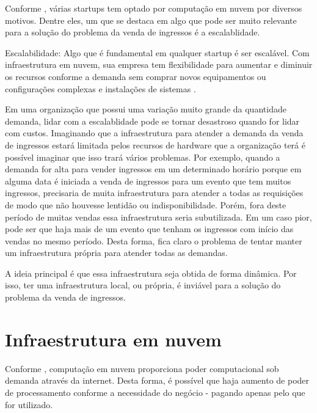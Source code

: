 Conforme \cite{beneficios-da-computacao-em-nuvem-para-sua-startup}, várias startups
tem optado por computação em nuvem por diversos motivos. Dentre eles, um que se destaca
em algo que pode ser muito relevante para a solução do problema da venda de ingressos é
a escalablidade.

\begin{citacao}
Escalabilidade: Algo que é fundamental em qualquer startup é ser escalável.
Com infraestrutura em nuvem, sua empresa tem flexibilidade para aumentar e
diminuir os recursos conforme a demanda sem comprar novos equipamentos ou
configurações complexas e instalações de
sistemas \cite{beneficios-da-computacao-em-nuvem-para-sua-startup}.

\end{citacao}

Em uma organização que possui uma variação muito grande da quantidade demanda, lidar
com a escalablidade pode se tornar desastroso quando for lidar com custos. Imaginando
que a infraestrutura para atender a demanda da venda de ingressos estará limitada
pelos recursos de hardware que a organização terá é possível imaginar que isso trará
vários problemas. Por exemplo, quando a demanda for alta para vender ingressos em um
determinado horário porque em alguma data é iniciada a venda de ingressos para um evento
que tem muitos ingressos, precisaria de muita infraestrutura para atender a todas as
requisições de modo que não houvesse lentidão ou indisponibilidade. Porém, fora deste
período de muitas vendas essa infraestrutura seria subutilizada. Em um caso pior, pode
ser que haja mais de um evento que tenham os ingressos com início das vendas no mesmo
período. Desta forma, fica claro o problema de tentar manter um infraestrutura própria
para atender todas as demandas.

A ideia principal é que essa infraestrutura seja obtida de forma dinâmica. Por isso,
ter uma infraestrutura local, ou própria, é inviável para a solução do problema da
venda de ingressos.

\section{Infraestrutura em nuvem}\label{infraestrutura-em-nuvem}

Conforme \cite{what-is-cloud-computing}, computação em nuvem proporciona poder computacional
sob demanda através da internet. Desta forma, é possível que haja aumento de poder
de processamento conforme a necessidade do negócio - pagando apenas pelo que for utilizado.

